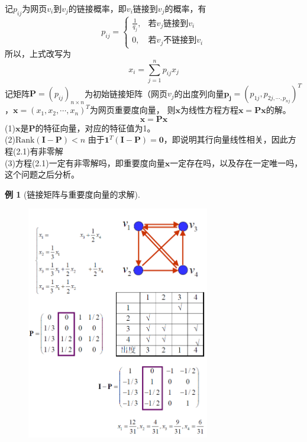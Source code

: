 \documentclass[12pt, a4paper, oneside]{ctexbook}
\newtheorem{example}[theorem]{例}
\begin{document}
\noindent 记$p_{ij}$为网页$v_i$到$v_j$的链接概率，即$v_i$链接到$v_j$的概率，有
$$p_{ij}=\begin{cases}
\frac{1}{q_j},&\text{若}v_j\text{链接到}v_i\\
0,&\text{若}v_j\text{不链接到}v_i
\end{cases}$$
所以，上式改写为
$$x_i=\sum_{j=1}^np_{ij}x_j$$
记矩阵$\mathbf{P}=(p_{ij})_{n\times n}$为初始链接矩阵（网页$v_j$的出度列向量$\mathbf{p_j} = (p_{1j},p_{2j,\cdots,p_{nj}})^T$，$\mathbf{x}=(x_1,x_2,\cdots,x_n)^T$为网页重要度向量，
则$\mathbf{x}$为线性方程方程$\mathbf{x}=\mathbf{P}\mathbf{x}$的解。
\begin{equation}
    \mathbf{x}=\mathbf{P}\mathbf{x}
\end{equation}
\noindent(1)$\mathbf{x}$是$\mathbf{P}$的特征向量，对应的特征值为1。\\
(2)$\text{Rank}(\mathbf{I}-\mathbf{P})<n$ 由于$\mathbf{1}^T(\mathbf{I}-\mathbf{P}) = \mathbf{0}$，即说明其行向量线性相关，因此方程(2.1)有非零解\\
(3)方程(2.1)一定有非零解吗，即重要度向量$\mathbf{x}$一定存在吗，以及存在一定唯一吗，这个问题之后分析。
\begin{example}[链接矩阵与重要度向量的求解]
    \begin{figure}[H]
        \centering
        \includegraphics[width=8cm]{assets/网页重要度例题.png}
    \end{figure}
\end{example}
\end{document}
